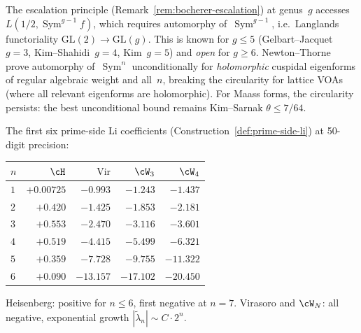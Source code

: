 \begin{remark}%
\label{rem:escalation-circularity}%
%
%
%
The escalation principle (Remark~\ref{rem:bocherer-escalation})
at genus~$g$ accesses $L(1/2, \operatorname{Sym}^{g-1} f)$,
which requires automorphy of~$\operatorname{Sym}^{g-1}$,
i.e.\ Langlands functoriality
$\mathrm{GL}(2) \to \mathrm{GL}(g)$.
This is known for $g \leq 5$
(Gelbart--Jacquet~$g{=}3$, Kim--Shahidi~$g{=}4$, Kim~$g{=}5$)
and \emph{open} for $g \geq 6$.
Newton--Thorne~\cite{NewtonThorne2021} prove automorphy
of~$\operatorname{Sym}^n$ unconditionally for \emph{holomorphic}
cuspidal eigenforms of regular algebraic weight and all~$n$,
breaking the circularity for lattice VOAs
(where all relevant eigenforms are holomorphic).
For Maass forms, the circularity persists: the best
unconditional bound remains Kim--Sarnak
$\theta \leq 7/64$.
\end{remark}

\begin{remark}%
\label{rem:li-numerical-values-arith}%
%
The first six prime-side Li coefficients
(Construction~\ref{def:prime-side-li}) at 50-digit
precision:
\begin{center}
\small
\renewcommand{\arraystretch}{1.1}
\begin{tabular}{lrrrr}
\toprule
$n$ & $\cH$ & $\mathrm{Vir}$ & $\cW_3$ & $\cW_4$ \\
\midrule
$1$ & $+0.00725$ & $-0.993$ & $-1.243$ & $-1.437$ \\
$2$ & $+0.420$ & $-1.425$ & $-1.853$ & $-2.181$ \\
$3$ & $+0.553$ & $-2.470$ & $-3.116$ & $-3.601$ \\
$4$ & $+0.519$ & $-4.415$ & $-5.499$ & $-6.321$ \\
$5$ & $+0.359$ & $-7.728$ & $-9.755$ & $-11.322$ \\
$6$ & $+0.090$ & $-13.157$ & $-17.102$ & $-20.450$ \\
\bottomrule
\end{tabular}
\end{center}
Heisenberg: positive for $n \leq 6$, first negative at $n = 7$.
Virasoro and $\cW_N$: all negative, exponential growth
$|\tilde\lambda_n| \sim C \cdot 2^n$.
\end{remark}

